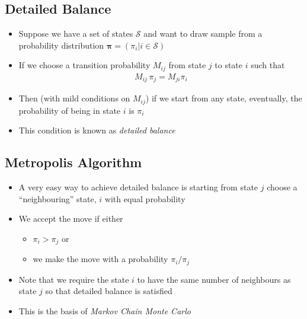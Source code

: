 \begin{slide}
\section{Detailed Balance}

\begin{PauseHighLight}
  \begin{itemize}
  \item Suppose we have a set of states $\mathcal{S}$ and want to draw
    sample from a probability distribution $\bm{\pi} = (\pi_i | i \in
    \mathcal{S})$\pause
  \item If we choose a transition probability $M_{ij}$ from state $j$ to
    state $i$ such that
    \begin{align*}
      M_{ij} \, \pi_j = M_{ji} \pi_i
    \end{align*}
  \item Then (with mild conditions on $M_{ij}$) if we start from any
    state, eventually, the probability of being in state $i$ is
    $\pi_i$\pause
  \item This condition is known as \emph{detailed balance}\pause
  \end{itemize}
\end{PauseHighLight}

\end{slide}


\begin{slide}
\section{Metropolis Algorithm}

\begin{PauseHighLight}
  \begin{itemize}
  \item A very easy way to achieve detailed balance is starting from
    state $j$ choose a ``neighbouring'' state, $i$ with equal
    probability\pause
  \item We accept the move if either
    \begin{itemize}
    \item $\pi_i>\pi_j$ or
    \item we make the move with a probability $\pi_i/\pi_j$\pause
    \end{itemize}
  \item Note that we require the state $i$ to have the same number of
    neighbours as state $j$ so that detailed balance is satisfied\pause
  \item This is the basis of \emph{Markov Chain Monte Carlo}\pause
  \end{itemize}
\end{PauseHighLight}

\end{slide}

